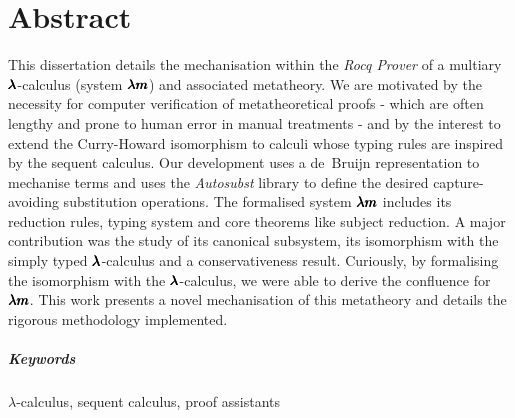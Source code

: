 \chapter*{Abstract}
\thispagestyle{title_on_header}

This dissertation details the mechanisation within the \textit{Rocq Prover} of a multiary $\pmb{\lambda}$-calculus (system $\pmb{\lambda m}$) and associated metatheory.
We are motivated by the necessity for computer verification of metatheoretical proofs - which are often lengthy and prone to human error in manual treatments - and by the interest to extend the Curry-Howard isomorphism to calculi whose typing rules are inspired by the sequent calculus.
Our development uses a de~Bruijn representation to mechanise terms and uses the \textit{Autosubst} library to define the desired capture-avoiding substitution operations.
The formalised system $\pmb{\lambda m}$ includes its reduction rules, typing system and core theorems like subject reduction.
A major contribution was the study of its canonical subsystem, its isomorphism with the simply typed $\pmb{\lambda}$-calculus and a conservativeness result.
Curiously, by formalising the isomorphism with the $\pmb{\lambda}$-calculus, we were able to derive the confluence for $\pmb{\lambda m}$.
This work presents a novel mechanisation of this metatheory and details the rigorous methodology implemented.

\paragraph{Keywords} $\lambda$-calculus, sequent calculus, proof assistants

